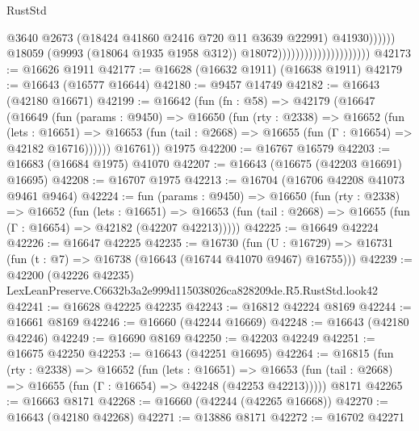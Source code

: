 \begin{lexlean}{RustStd}
\begin{coremodule}
                                                          @3640
                                                          @2673
                                                          (@18424
                                                            @41860
                                                            @2416
                                                            @720
                                                            @11
                                                            @3639
                                                            @22991)
                                                          @41930))))))
                                              @18059
                                              (@9993 (@18064 @1935 @1958 @312))
                                              @18072)))))))))))))))))))))
@42173 := @16626 @1911
@42177 := @16628 (@16632 @1911) (@16638 @1911)
@42179 := @16643 (@16577 @16644)
@42180 := @9457 @14749
@42182 := @16643 (@42180 @16671)
@42199 := @16642
    (fun (fn : @58) =>
    @42179
      (@16647
        (@16649
          (fun (params : @9450) =>
          @16650
            (fun (rty : @2338) =>
            @16652
              (fun (lets : @16651) =>
              @16653 (fun (tail : @2668) => @16655 (fun (Γ : @16654) => @42182 @16716))))))
        @16761))
    @1975
@42200 := @16767 @16579
@42203 := @16683 (@16684 @1975) @41070
@42207 := @16643 (@16675 (@42203 @16691) @16695)
@42208 := @16707 @1975
@42213 := @16704 (@16706 @42208 @41073 @9461 @9464)
@42224 := fun (params : @9450) =>
  @16650
    (fun (rty : @2338) =>
    @16652
      (fun (lets : @16651) =>
      @16653 (fun (tail : @2668) => @16655 (fun (Γ : @16654) => @42182 (@42207 @42213)))))
@42225 := @16649 @42224
@42226 := @16647 @42225
@42235 := @16730
    (fun (U : @16729) => @16731 (fun (t : @7) => @16738 (@16643 (@16744 @41070 @9467) @16755)))
@42239 := @42200 (@42226 @42235) LexLeanPreserve.C6632b3a2e999d115038026ca828209de.R5.RustStd.look42
@42241 := @16628 @42225 @42235
@42243 := @16812 @42224 @8169
@42244 := @16661 @8169
@42246 := @16660 (@42244 @16669)
@42248 := @16643 (@42180 @42246)
@42249 := @16690 @8169
@42250 := @42203 @42249
@42251 := @16675 @42250
@42253 := @16643 (@42251 @16695)
@42264 := @16815
    (fun (rty : @2338) =>
    @16652
      (fun (lets : @16651) =>
      @16653 (fun (tail : @2668) => @16655 (fun (Γ : @16654) => @42248 (@42253 @42213)))))
    @8171
@42265 := @16663 @8171
@42268 := @16660 (@42244 (@42265 @16668))
@42270 := @16643 (@42180 @42268)
@42271 := @13886 @8171
@42272 := @16702 @42271

\end{coremodule}
\end{lexlean}
